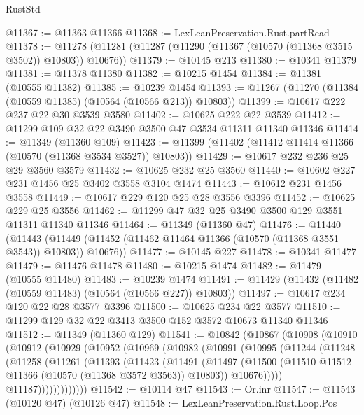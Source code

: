 \begin{lexlean}{RustStd}
\begin{coremodule}
@11367 := @11363 @11366
@11368 := LexLeanPreservation.Rust.partRead
@11378 := @11278 (@11281 (@11287 (@11290 (@11367 (@10570 (@11368 @3515 @3502)) @10803)) @10676))
@11379 := @10145 @213
@11380 := @10341 @11379
@11381 := @11378 @11380
@11382 := @10215 @1454
@11384 := @11381 (@10555 @11382)
@11385 := @10239 @1454
@11393 := @11267 (@11270 (@11384 (@10559 @11385) (@10564 (@10566 @213)) @10803))
@11399 := @10617 @222 @237 @22 @30 @3539 @3580
@11402 := @10625 @222 @22 @3539
@11412 := @11299 @109 @32 @22 @3490 @3500 @47 @3534 @11311 @11340 @11346
@11414 := @11349 (@11360 @109)
@11423 := @11399 (@11402 (@11412 @11414 @11366 (@10570 (@11368 @3534 @3527)) @10803))
@11429 := @10617 @232 @236 @25 @29 @3560 @3579
@11432 := @10625 @232 @25 @3560
@11440 := @10602 @227 @231 @1456 @25 @3402 @3558 @3104 @1474
@11443 := @10612 @231 @1456 @3558
@11449 := @10617 @229 @120 @25 @28 @3556 @3396
@11452 := @10625 @229 @25 @3556
@11462 := @11299 @47 @32 @25 @3490 @3500 @129 @3551 @11311 @11340 @11346
@11464 := @11349 (@11360 @47)
@11476 := @11440
    (@11443 (@11449 (@11452 (@11462 @11464 @11366 (@10570 (@11368 @3551 @3543)) @10803)) @10676))
@11477 := @10145 @227
@11478 := @10341 @11477
@11479 := @11476 @11478
@11480 := @10215 @1474
@11482 := @11479 (@10555 @11480)
@11483 := @10239 @1474
@11491 := @11429 (@11432 (@11482 (@10559 @11483) (@10564 (@10566 @227)) @10803))
@11497 := @10617 @234 @120 @22 @28 @3577 @3396
@11500 := @10625 @234 @22 @3577
@11510 := @11299 @129 @32 @22 @3413 @3500 @152 @3572 @10673 @11340 @11346
@11512 := @11349 (@11360 @129)
@11541 := @10842
    (@10867
      (@10908
        (@10910
          (@10912
            (@10929
              (@10952
                (@10969
                  (@10982
                    (@10991
                      (@10995
                        (@11244
                          (@11248
                            (@11258
                              (@11261
                                (@11393
                                  (@11423
                                    (@11491
                                      (@11497
                                        (@11500
                                          (@11510
                                            @11512
                                            @11366
                                            (@10570 (@11368 @3572 @3563))
                                            @10803))
                                        @10676)))))
                              @11187)))))))))))))
@11542 := @10114 @47
@11543 := Or.inr
@11547 := @11543 (@10120 @47) (@10126 @47)
@11548 := LexLeanPreservation.Rust.Loop.Pos

\end{coremodule}
\end{lexlean}
